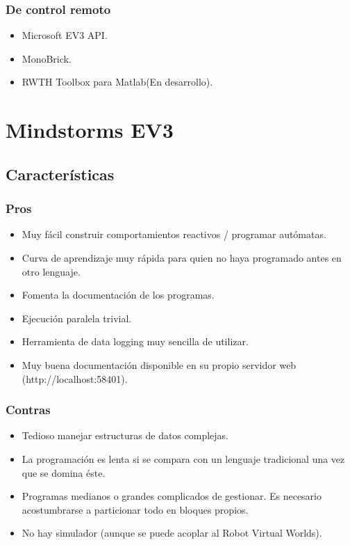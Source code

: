 \documentclass[12pt,a4paper]{article}
\begin{document}
  \subsubsection{De control remoto}
      \begin{itemize}
      \item Microsoft EV3 API.
      \item MonoBrick.
      \item RWTH Toolbox para Matlab(En desarrollo).
      \end{itemize}
\section{Mindstorms EV3}
\subsection{Características}
\subsubsection{Pros}
      \begin{itemize}
      \item Muy fácil construir comportamientos reactivos / programar autómatas.
      \item Curva de aprendizaje muy rápida para quien no haya programado antes en otro lenguaje.
      \item Fomenta la documentación de los programas.
      \item Ejecución paralela trivial.
      \item Herramienta de data logging muy sencilla de utilizar.
      \item Muy buena documentación disponible en su propio servidor web (http://localhost:58401).
      \end{itemize}
\subsubsection{Contras}
      \begin{itemize}
      \item Tedioso manejar estructuras de datos complejas.
      \item La programación es lenta si se compara con un lenguaje tradicional una vez que se domina éste.
      \item Programas medianos o grandes complicados de gestionar. Es necesario acostumbrarse a particionar todo en bloques propios.
      \item No hay simulador (aunque se puede acoplar al Robot Virtual Worlds).
      \end{itemize}
\end{document}
